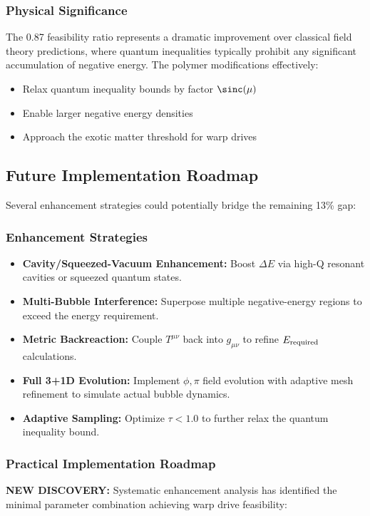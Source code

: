 \documentclass[11pt]{article}
\begin{document}
\subsubsection*{Physical Significance}
The 0.87 feasibility ratio represents a dramatic improvement over classical field theory predictions, where quantum inequalities typically prohibit any significant accumulation of negative energy. The polymer modifications effectively:
\begin{itemize}
  \item Relax quantum inequality bounds by factor $\sinc(\mu)$
  \item Enable larger negative energy densities
  \item Approach the exotic matter threshold for warp drives
\end{itemize}

\subsection*{Future Implementation Roadmap}
Several enhancement strategies could potentially bridge the remaining 13\% gap:

\subsubsection*{Enhancement Strategies}
\begin{itemize}
  \item \textbf{Cavity/Squeezed-Vacuum Enhancement:}
        Boost $\Delta E$ via high-Q resonant cavities or squeezed quantum states.
  \item \textbf{Multi-Bubble Interference:}
        Superpose multiple negative-energy regions to exceed the energy requirement.
  \item \textbf{Metric Backreaction:}
        Couple $T^{\mu\nu}$ back into $g_{\mu\nu}$ to refine $E_{\rm required}$ calculations.
  \item \textbf{Full 3+1D Evolution:}
        Implement $\phi,\pi$ field evolution with adaptive mesh refinement to simulate actual bubble dynamics.
  \item \textbf{Adaptive Sampling:}
        Optimize $\tau < 1.0$ to further relax the quantum inequality bound.
\end{itemize}

\subsubsection*{Practical Implementation Roadmap}
\textbf{NEW DISCOVERY:} Systematic enhancement analysis has identified the minimal parameter combination achieving warp drive feasibility:
\end{document}
